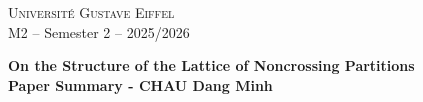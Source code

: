 \documentclass[11pt,a4paper]{article}
\begin{document}
\begin{center}

  \textsc{Universit\'e Gustave Eiffel} \hfill  \,\\
  M2 -- Semester 2 -- 2025/2026 \hfill \, \\
  \bigskip

  {\bf
    \vspace{0.9cm}
    \Large On the Structure of the Lattice of Noncrossing Partitions\\
    \vspace{0.2cm}
    \normalsize Paper Summary - CHAU Dang Minh
  }
\end{center}
\bigskip



\end{document}
